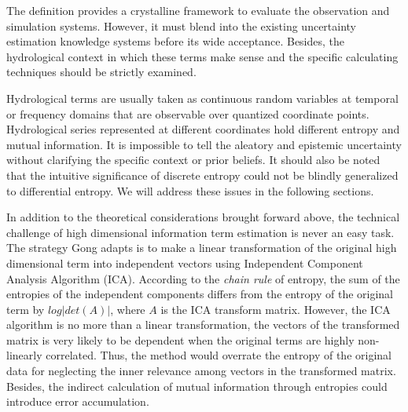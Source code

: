\documentclass[draft,wrr]{AGUTeX}
\begin{document}
\begin{article}
The definition provides a crystalline framework to evaluate the observation and simulation systems. However, it must blend into the existing uncertainty estimation knowledge systems before its wide  acceptance. Besides, the hydrological context in which these terms make sense and the specific calculating techniques should be strictly examined. 

Hydrological terms are usually taken as continuous random variables at temporal or frequency domains that are observable over quantized coordinate points. Hydrological series represented at different coordinates hold different entropy and mutual information. It is impossible to tell the aleatory and epistemic uncertainty without clarifying the specific context or prior beliefs\citep{weijs2013data}. It should also be noted that the intuitive significance of discrete entropy could not be blindly generalized to differential entropy. We will address these issues in the following sections. 

In addition to the theoretical considerations brought forward above, the technical challenge of high dimensional information term estimation is never an easy task. The strategy Gong adapts is to make a linear transformation of the original high dimensional term into independent vectors using Independent Component Analysis  Algorithm (ICA)\citep{hyvarinen2004independent}. According to the \emph{chain rule} of entropy, the sum of the entropies of the independent components differs from the entropy of the original term by $log|det(A)|$, where $A$ is the ICA transform matrix. However, the ICA algorithm is no more than a linear transformation, the vectors of the transformed matrix is very likely to be dependent when the original terms are highly non-linearly correlated. Thus, the method would overrate the entropy of the original data for neglecting the inner relevance among vectors in the transformed matrix. Besides, the indirect calculation of mutual information through entropies could introduce error accumulation.



\end{article}
\end{document}
